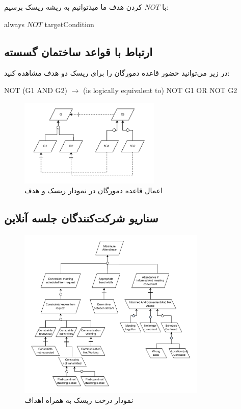 با $NOT$ کردن هدف ما میذتوانیم به ریشه ریسک برسیم:

\begin{LTR}
     always $NOT$ targetCondition
\end{LTR}

\subsection{ارتباط با قواعد ساختمان گسسته}

در زیر می‌توانید حضور قاعده دمورگان را برای ریسک دو هدف مشاهده کنید:

\begin{LTR}
    NOT (G1 AND G2) $\rightarrow$ (is logically equivalent to) NOT G1 OR NOT G2
\end{LTR}

\begin{figure}[H]
    \centering
    \includegraphics[width=0.6\textwidth]{assets/de-morgan.drawio.pdf}
    \caption{اعمال قاعده دمورگان در نمودار ریسک و هدف}
\end{figure}

\subsection{سناریو شرکت‌کنندگان جلسه آنلاین}

\begin{figure}[H]
    \centering
    \includegraphics[width=0.8\textwidth]{assets/online_attendance.drawio.pdf}
    \caption{نمودار درخت ریسک به همراه اهداف}
\end{figure}

